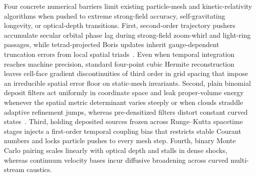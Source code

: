Four concrete numerical barriers limit existing particle-mesh and kinetic-relativity algorithms when pushed to extreme strong-field accuracy, self-gravitating longevity, or optical-depth transitions. First, second-order trajectory pushers accumulate secular orbital phase lag during strong-field zoom-whirl and light-ring passages, while tetrad-projected Boris updates inherit gauge-dependent truncation errors from local spatial triads~\cite{Olivares:2021cfa,Boyeneni:2025tsx,Wu:2026nrpic}. Even when temporal integration reaches machine precision, standard four-point cubic Hermite reconstruction leaves cell-face gradient discontinuities of third order in grid spacing that impose an irreducible spatial error floor on static-mesh invariants. Second, plain binomial deposit filters act uniformly in coordinate space and leak proper-volume energy whenever the spatial metric determinant varies steeply or when clouds straddle adaptive refinement jumps, whereas pre-densitized filters distort constant curved states~\cite{1991ppcs.book.....B,Wu:2026nrpic}. Third, holding deposited sources frozen across Runge--Kutta spacetime stages injects a first-order temporal coupling bias that restricts stable Courant numbers and locks particle pushes to every mesh step. Fourth, binary Monte Carlo pairing scales linearly with optical depth and stalls in dense shocks, whereas continuum velocity bases incur diffusive broadening across curved multi-stream caustics.

